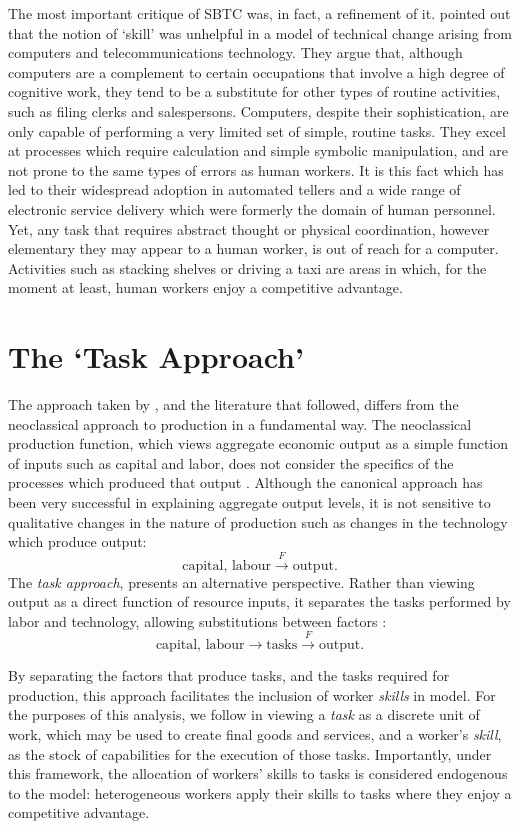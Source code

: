 The most important critique of SBTC was, in fact, a refinement of it. \citet{Levy2003} pointed out that the notion of `skill' was unhelpful in a model of technical change arising from computers and telecommunications technology. They argue that, although computers are a complement to certain occupations that involve a high degree of cognitive work, they tend to be a substitute for other types of routine activities, such as filing clerks and salespersons. Computers, despite their sophistication, are only capable of performing a very limited set of simple, routine tasks. They excel at processes which require calculation and simple symbolic manipulation, and are not prone to the same types of errors as human workers. It is this fact which has led to their widespread adoption in automated tellers and a wide range of electronic service delivery which were formerly the domain of human personnel. Yet, any task that requires abstract thought or physical coordination, however elementary they may appear to a human worker, is out of reach for a computer. Activities such as stacking shelves or driving a taxi are areas in which, for the moment at least, human workers enjoy a competitive advantage. 

\section{The `Task Approach'}

The approach taken by \citet{Levy2003}, and the literature that followed, differs from the neoclassical approach to production in a fundamental way. The neoclassical production function, which views aggregate economic output as a simple function of inputs such as capital and labor, does not consider the specifics of the processes which produced that output \citep{Acemoglu2011}. Although the canonical approach has been very successful in explaining aggregate output levels, it is not sensitive to qualitative changes in the nature of production such as changes in the technology which produce output:
\[ \text{capital, labour} \overset{F}{\longrightarrow} \text{output}. \]
The {\em task approach}, presents an alternative perspective. Rather than viewing output as a direct function of resource inputs, it separates the tasks performed by labor and technology, allowing  substitutions between factors \citep{Autor2013,Acemoglu2011}:
\[ \text{capital, labour} \longrightarrow \text{tasks} \overset{F}{\longrightarrow} \text{output}. \]

By separating the factors that produce tasks, and the tasks required for production, this approach facilitates the inclusion of worker \emph{skills} in model. For the purposes of this analysis, we follow \citet{Autor2013} in viewing a \emph{task} as a discrete unit of work, which may be used to create final goods and services, and a worker's \emph{skill}, as the stock of capabilities for the execution of those tasks. Importantly, under this framework, the allocation of workers' skills to tasks is considered endogenous to the model: heterogeneous workers apply their skills to tasks where they enjoy a competitive advantage.

